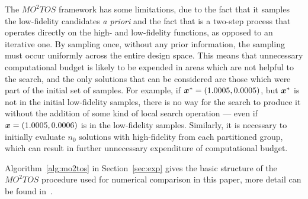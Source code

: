 The $MO^2TOS$ framework has some limitations, due to the fact that it samples the low-fidelity candidates \emph{a priori} and the fact that is a two-step process that operates directly on the high- and low-fidelity functions, as opposed to an iterative one. By sampling once, without any prior information, the sampling must occur uniformly across the entire design space. This means that unnecessary computational budget is likely to be expended in areas which are not helpful to the search, and the only solutions that can be considered are those which were part of the initial set of samples. For example, if $\boldsymbol{x}^* = (1.0005,0.0005)$, but $\boldsymbol{x}^*$ is not in the initial low-fidelity samples, there is no way for the search to produce it without the addition of some kind of local search operation --- even if $\boldsymbol{x}= (1.0005,0.0006)$ is in the low-fidelity samples. Similarly, it is necessary to initially evaluate $n_0$ solutions with high-fidelity from each partitioned group, which can result in further unnecessary expenditure of computational budget.

Algorithm~\ref{alg:mo2tos} in Section~\ref{sec:exp} gives the basic structure of the $MO^2TOS$ procedure used for numerical comparison in this paper, more detail can be found in~\cite{xu2016mo2tos}.